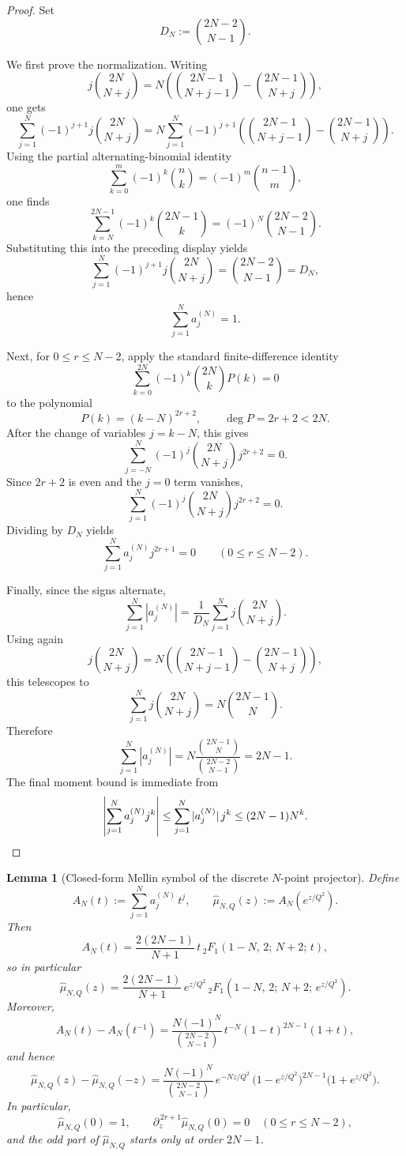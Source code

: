 \documentclass[11pt,a4paper]{amsart}
\theoremstyle{plain}
\newtheorem{lemma}[theorem]{Lemma}
\theoremstyle{definition}
\begin{document}
\begin{proof}
Set
\[
D_N:=\binom{2N-2}{N-1}.
\]

We first prove the normalization. Writing
\[
j\binom{2N}{N+j}
=
N\!\left(\binom{2N-1}{N+j-1}-\binom{2N-1}{N+j}\right),
\]
one gets
\[
\sum_{j=1}^N (-1)^{j+1}j\binom{2N}{N+j}
=
N\sum_{j=1}^N (-1)^{j+1}
\left(\binom{2N-1}{N+j-1}-\binom{2N-1}{N+j}\right).
\]
Using the partial alternating-binomial identity
\[
\sum_{k=0}^{m}(-1)^k\binom{n}{k}
=
(-1)^m\binom{n-1}{m},
\]
one finds
\[
\sum_{k=N}^{2N-1}(-1)^k\binom{2N-1}{k}
=
(-1)^N\binom{2N-2}{N-1}.
\]
Substituting this into the preceding display yields
\[
\sum_{j=1}^N (-1)^{j+1}j\binom{2N}{N+j}
=
\binom{2N-2}{N-1}
=
D_N,
\]
hence
\[
\sum_{j=1}^N a_j^{(N)}=1.
\]

Next, for $0\le r\le N-2$, apply the standard finite-difference identity
\[
\sum_{k=0}^{2N}(-1)^k\binom{2N}{k}P(k)=0
\]
to the polynomial
\[
P(k)=(k-N)^{2r+2},
\qquad
\deg P=2r+2<2N.
\]
After the change of variables $j=k-N$, this gives
\[
\sum_{j=-N}^{N}(-1)^j\binom{2N}{N+j}j^{2r+2}=0.
\]
Since $2r+2$ is even and the $j=0$ term vanishes,
\[
\sum_{j=1}^{N}(-1)^j\binom{2N}{N+j}j^{2r+2}=0.
\]
Dividing by $D_N$ yields
\[
\sum_{j=1}^N a_j^{(N)}j^{2r+1}=0
\qquad (0\le r\le N-2).
\]

Finally, since the signs alternate,
\[
\sum_{j=1}^N |a_j^{(N)}|
=
\frac{1}{D_N}\sum_{j=1}^N j\binom{2N}{N+j}.
\]
Using again
\[
j\binom{2N}{N+j}
=
N\!\left(\binom{2N-1}{N+j-1}-\binom{2N-1}{N+j}\right),
\]
this telescopes to
\[
\sum_{j=1}^N j\binom{2N}{N+j}
=
N\binom{2N-1}{N}.
\]
Therefore
\[
\sum_{j=1}^N |a_j^{(N)}|
=
N\frac{\binom{2N-1}{N}}{\binom{2N-2}{N-1}}
=
2N-1.
\]
The final moment bound is immediate from
\[
\left|\sum_{j=1}^N a_j^{(N)}j^k\right|
\le
\sum_{j=1}^N |a_j^{(N)}|\,j^k
\le
(2N-1)N^k.
\qedhere
\]
\end{proof}

\begin{lemma}[Closed-form Mellin symbol of the discrete $N$-point projector]
\label{lem:n-point-mellin-symbol}
Define
\[
A_N(t):=\sum_{j=1}^N a_j^{(N)}\,t^j,
\qquad
\widehat\mu_{N,Q}(z):=A_N(e^{z/Q^2}).
\]
Then
\[
A_N(t)
=
\frac{2(2N-1)}{N+1}\,
t\,{}_2F_1(1-N,\,2;\,N+2;\,t),
\]
so in particular
\[
\widehat\mu_{N,Q}(z)
=
\frac{2(2N-1)}{N+1}\,
e^{z/Q^2}\,
{}_2F_1(1-N,\,2;\,N+2;\,e^{z/Q^2}).
\]
Moreover,
\[
A_N(t)-A_N(t^{-1})
=
\frac{N(-1)^N}{\binom{2N-2}{N-1}}\,
t^{-N}(1-t)^{2N-1}(1+t),
\]
and hence
\[
\widehat\mu_{N,Q}(z)-\widehat\mu_{N,Q}(-z)
=
\frac{N(-1)^N}{\binom{2N-2}{N-1}}\,
e^{-Nz/Q^2}\,
\bigl(1-e^{z/Q^2}\bigr)^{2N-1}
\bigl(1+e^{z/Q^2}\bigr).
\]
In particular,
\[
\widehat\mu_{N,Q}(0)=1,
\qquad
\partial_z^{\,2r+1}\widehat\mu_{N,Q}(0)=0
\quad (0\le r\le N-2),
\]
and the odd part of $\widehat\mu_{N,Q}$ starts only at order $2N-1$.
\end{lemma}
\end{document}
